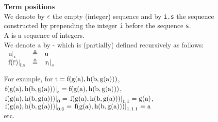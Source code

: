 \bigskip

\noindent
\textbf{Term positions}\\
We denote by $\epsilon$ the empty (integer) sequence and by \lstinline{i.s} the sequence constructed by prepending the integer \lstinline{i} before the sequence \lstinline{s}.\\
A  is a sequence of integers.\\
We denote a  by  - which is (partially) defined recursively as follows:\\
$
\begin{array}{lll}
	\left.\mathrm{u}\right|_{\mathrm{\epsilon}}    & \triangleq & \mathrm{u} \\
	\left.\mathrm{f(\mathrm{\overline{r}})}\right|_{\mathrm{i.s}} & \triangleq & \left.\mathrm{\mathrm{r}_{\mathrm{i}}}\right|_{\mathrm{s}}
\end{array}
$

\noindent
For example, for  $\mathrm{t=f(g(a),h(b,g(a)))}$, \\
$\left.\mathrm{f(g(a),h(b,g(a)))}\right|_{\mathrm{\epsilon}}=\mathrm{f(g(a),h(b,g(a)))}$, \\
$\left.\mathrm{f(g(a),h(b,g(a)))}\right|_{\mathrm{0}}        =\left.\mathrm{f(g(a),h(b,g(a)))}\right|_{\mathrm{1.1}}=\mathrm{g(a)}$, \\
$\left.\mathrm{f(g(a),h(b,g(a)))}\right|_{\mathrm{0.0}}      =\left.\mathrm{f(g(a),h(b,g(a)))}\right|_{\mathrm{1.1.1}}=\mathrm{a}$ \\
etc.

